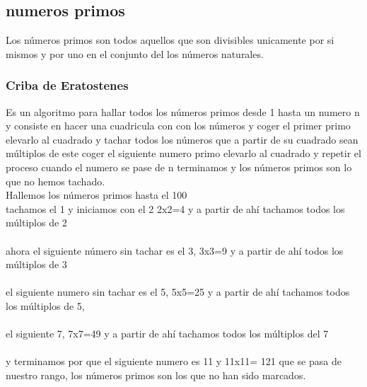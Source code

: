 \subsection{numeros primos}
Los números primos son todos  aquellos que son divisibles unicamente por si mismos y por uno en el conjunto del los números naturales.

\subsubsection{Criba de Eratostenes}
Es un algoritmo para hallar todos los números primos desde 1 hasta un numero n y consiste en hacer una cuadricula con
con los números y coger el primer primo elevarlo al cuadrado y tachar todos los números que a partir de su cuadrado sean
 múltiplos de este coger el siguiente numero  primo elevarlo al cuadrado y repetir el proceso cuando el numero se pase de n terminamos
y los números primos son lo que no hemos tachado.
\\Hallemos los números primos hasta el 100
\\tachamos el 1 y iniciamos con el 2 2x2=4 y a partir de ahí tachamos todos los múltiplos de 2
\\
\\ahora el siguiente número sin tachar es el 3, 3x3=9 y a partir de ahí todos los múltiplos de 3
\\
\\el siguiente numero sin tachar es el 5, 5x5=25 y a partir de ahí tachamos todos los múltiplos de 5,
\\
\\el siguiente 7, 7x7=49 y a partir de ahí tachamos todos los múltiplos del 7
\\
\\y terminamos por que el siguiente numero es 11 y 11x11= 121 que se pasa de nuestro rango, los números primos son los que no han sido marcados.
